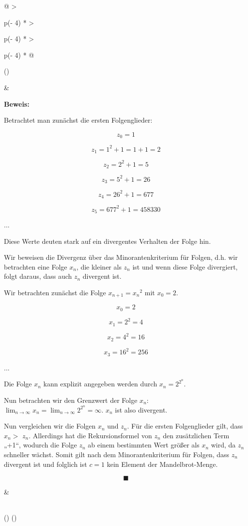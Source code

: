 \documentclass[a4paper, 12pt]{book}
\begin{document}
\begin{longtable}[]{@{}
  >{\raggedright\arraybackslash}p{(\columnwidth - 4\tabcolsep) * }
  >{\raggedright\arraybackslash}p{(\columnwidth - 4\tabcolsep) * }
  >{\raggedright\arraybackslash}p{(\columnwidth - 4\tabcolsep) * }@{}}
\toprule()
\begin{minipage}[b]{\linewidth}\raggedright
\end{minipage} & \begin{minipage}[b]{\linewidth}\raggedright
\textbf{Beweis:}

Betrachtet man zunächst die ersten Folgenglieder:

\[z_{0} = 1\]

\[z_{1} = 1^{2} + 1 = 1 + 1 = 2\]

\[z_{2} = 2^{2} + 1 = 5\]

\[z_{3} = 5^{2} + 1 = 26\]

\[z_{4} = 26^{2} + 1 = 677\]

\[z_{5} = 677^{2} + 1 = 458330\]

...

Diese Werte deuten stark auf ein divergentes Verhalten der Folge hin.

Wir beweisen die Divergenz über das Minorantenkriterium für Folgen, d.h.
wir betrachten eine Folge \(x_{n}\), die kleiner als \(z_{n}\) ist und
wenn diese Folge divergiert, folgt daraus, dass auch \(z_{n}\) divergent
ist.

Wir betrachten zunächst die Folge \(x_{n + 1} = {x_{n}}^{2}\) mit
\(x_{0} = 2\).

\[x_{0} = 2\]

\[x_{1} = 2^{2} = 4\]

\[x_{2} = 4^{2} = 16\]

\[x_{3} = 16^{2} = 256\]

...

Die Folge \(x_{n}\) kann explizit angegeben werden durch
\(x_{n} = 2^{2^{n}}\).

Nun betrachten wir den Grenzwert der Folge \(x_{n}\):
\(\lim_{n \rightarrow \infty}x_{n} = \lim_{n \rightarrow \infty}2^{2^{n}} = \infty\).
\(x_{n}\) ist also divergent.

Nun vergleichen wir die Folgen \(x_{n}\) und \(z_{n}\). Für die ersten
Folgenglieder gilt, dass \(x_{n} > \) \(z_{n}\). Allerdings hat die
Rekursionsformel von \(z_{n}\) den zusätzlichen Term „+1``, wodurch die
Folge \(z_{n}\) ab einem bestimmten Wert größer als \(x_{n}\) wird, da
\(z_{n}\) schneller wächst. Somit gilt nach dem Minorantenkriterium für
Folgen, dass \(z_{n}\) divergent ist und folglich ist \(c = 1\) kein
Element der Mandelbrot-Menge.

\[\blacksquare\]
\end{minipage} & \begin{minipage}[b]{\linewidth}\raggedright
\end{minipage} \\
\midrule()
\endhead
\bottomrule()
\end{longtable}
\end{document}
